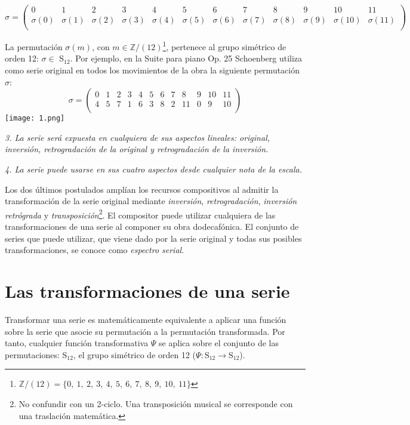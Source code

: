 		\begin{footnotesize}
			$$
			\sigma=\left(\begin{matrix}0&1&2&3&4&5&6&7&8&9&10&11\\\sigma(0)&\sigma(1)&\sigma(2)&\sigma(3)&\sigma(4)&\sigma(5)&\sigma(6)&\sigma(7)&\sigma(8)&\sigma(9)&\sigma(10)&\sigma(11)\\\end{matrix}\right)
			$$
		\end{footnotesize}	
	
		La permutación $\sigma(m)$, con $m\in \mathbb{Z} / (12)$\footnote{$\mathbb{Z} / (12)=\{0,\ 1,\ 2,\ 3,\ 4,\ 5,\ 6,\ 7,\ 8,\ 9,\ 10,\ 11\}$}, pertenece al grupo simétrico de orden 12: $\sigma\in$ S$_{12}$. Por ejemplo, en la Suite para piano Op. 25 Schoenberg utiliza como serie original en todos los movimientos de la obra la siguiente permutación $\sigma$:
		$$\sigma=\left(\begin{matrix}0&1&2&3&4&5&6&7&8&9&10&11\\4&5&7&1&6&3&8&2&11&0&9&10\\\end{matrix}\right)$$	
		\texttt{[image: 1.png]}
		
		\emph{3. La serie será expuesta en cualquiera de sus aspectos lineales: original, inversión, retrogradación de la original y retrogradación de la inversión.}
		 
		\emph{4. La serie puede usarse en sus cuatro aspectos desde cualquier nota de la escala.}
		
		Los dos últimos postulados amplían los recursos compositivos al admitir la transformación de la serie original mediante \emph{inversión}, \emph{retrogradación}, \emph{inversión retrógrada} y \emph{transposición}\footnote{No confundir con un 2-ciclo. Una transposición musical se corresponde con una traslación matemática.}. El compositor puede utilizar cualquiera de las transformaciones de una serie al componer su obra dodecafónica. El conjunto de series que puede utilizar, que viene dado por la serie original y todas sus posibles transformaciones, se conoce como \emph{espectro serial}.
		
	\section{Las transformaciones de una serie}
		\label{transPsi}
		Transformar una serie es matemáticamente equivalente a aplicar una función sobre la serie que asocie su permutación a la permutación transformada. Por tanto, cualquier función transformativa $\Psi$ se aplica sobre el conjunto de las permutaciones: S$_{12}$, el grupo simétrico de orden 12 ($\Psi:\text{S}_{12}\rightarrow\text{S}_{12}$).
		
